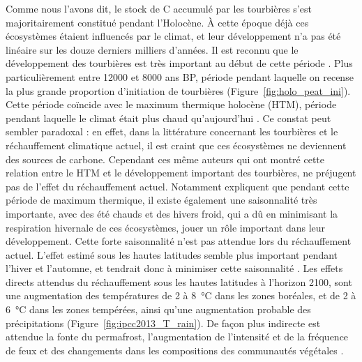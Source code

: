 Comme nous l'avons dit, le stock de C accumulé par les tourbières s'est majoritairement constitué pendant l'Holocène.
À cette époque déjà ces écosystèmes étaient influencés par le climat, et leur développement n'a pas été linéaire sur les douze derniers milliers d'années.
Il est reconnu que le développement des tourbières est très important au début de cette période \citep{smith2004,macdonald2006,yu2009}.
Plus particulièrement entre \num{12000} et \num{8000} ans BP, période pendant laquelle on recense la plus grande proportion d'initiation de tourbières (Figure~\ref{fig:holo_peat_ini}).
Cette période coïncide avec le maximum thermique holocène (HTM), période pendant laquelle le climat était plus chaud qu'aujourd’hui \citep{kaufman2004}.
Ce constat peut sembler paradoxal : en effet, dans la littérature concernant les tourbières et le réchauffement climatique actuel, il est craint que ces écosystèmes ne deviennent des sources de carbone.
Cependant ces même auteurs qui ont montré cette relation entre le HTM et le développement important des tourbières, ne préjugent pas de l'effet du réchauffement actuel.
Notamment \citet{jones2010} expliquent que pendant cette période de maximum thermique, il existe également une saisonnalité très importante, avec des été chauds et des hivers froid, qui a dû en minimisant la respiration hivernale de ces écosystèmes, jouer un rôle important dans leur développement.
Cette forte saisonnalité n'est pas attendue lors du réchauffement actuel.
L'effet estimé sous les hautes latitudes semble plus important pendant l'hiver et l'automne, et tendrait donc à minimiser cette saisonnalité \citep{christensen2007}.
Les effets directs attendus du réchauffement sous les hautes latitudes à l'horizon 2100, sont une augmentation des températures de 2 à \SI{8}{\degreeCelsius} dans les zones boréales, et de 2 à \SI{6}{\degreeCelsius} dans les zones tempérées, ainsi  qu'une augmentation probable des précipitations (Figure~\ref{fig:ipcc2013_T_rain}).
De façon plus indirecte est attendue la fonte du permafrost, l'augmentation de l'intensité et de la fréquence de feux et des changements dans les compositions des communautés végétales \citep{christensen2013,frolking2011}.

